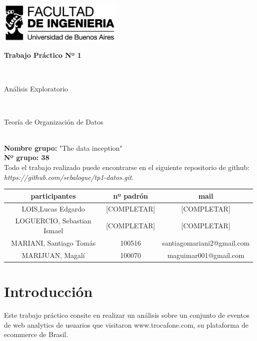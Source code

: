 \documentclass[titlepage,a4paper]{article}
\begin{document}
	\begin{titlepage}
		\hfill\includegraphics[width=6cm]{logofiuba.jpg}
		\center
		\vfill
		\vfill
		\begin{center}
			\begin{Huge}\textbf{Trabajo Práctico Nº 1}\end{Huge}\\
			\vfill
			\begin{huge}Análisis Exploratorio\end{huge}\\
			\vfill
			\begin{Large} Teoría de Organización de Datos\end{Large}\\

			\textbf{Nombre grupo:} "The data inception" \\
			\textbf{Nº grupo: 38}\\
				Todo el trabajo realizado puede encontrarse en el siguiente repositorio de github:\textit{ https://github.com/sebalogue/tp1-datos.git. }
	
			\vfill
			\begin{tabular}{|c|c|c|}
				\hline
				participantes & nº padrón & mail \\ \hline
				LOIS,Lucas Edgardo &[COMPLETAR] &  [COMPLETAR] \\ \hline		
				LOGUERCIO, Sebastian Ismael &[COMPLETAR] &  [COMPLETAR] \\ \hline
				MARIANI, Santiago Tomás &100516 &  santiagomariani2@gmail.com \\ \hline
				MARIJUAN, Magalí & 100070 & maguimar001@gmail.com\\ \hline
				
			\end{tabular}
			\vfill
			\vfill
			\vfill
			\vfill
			\vfill
			\vfill
		\end{center}
	
	\end{titlepage}

	\tableofcontents
	\newpage
	
	\section{Introducción}
	Este trabajo práctico consite en realizar un análisis sobre un conjunto de eventos de web analytics de usuarios que visitaron www.trocafone.com, su plataforma de ecommerce de Brasil.
	
\end{document}
